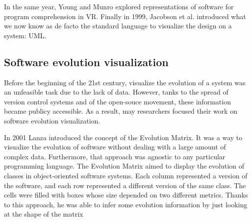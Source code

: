 In the same year, Young and Munro \cite{Young1998} explored representations of software for program comprehension in VR. 
Finally in 1999, Jacobson et al. \cite{Jacobson1999} introduced what we now know as de facto the standard language to visualize the design on a system: UML. 



\subsection{Software evolution visualization}
Before the beginning of the 21st century, visualize the evolution of a system was an unfeasible task due to the lack of data. 
However, tanks to the spread of version control systems and of the open-souce movement, these information became publicy accessible.
As a result, may researchers focused their work on software evolution visualization.

In 2001 Lanza \cite{Lanza2001} introduced the concept of the Evolution Matrix. It was a way to visualize the evolution of software without dealing with a large amount of complex data. 
Furthermore, that approach was agnostic to any particular programming language. The Evolution Matrix aimed to display the evolution of classes in object-oriented software systems. 
Each column represented a version of the software, and each row represented a different version of the same class. The cells were filled with boxes whose size depended on two different metrics. 
Thanks to this approach, he was able to infer some evolution information by just looking at the shape of the matrix

